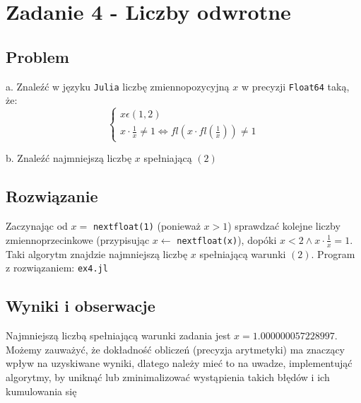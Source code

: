 \documentclass[12pt]{article}
\begin{document}
\newpage

\section*{Zadanie 4 - Liczby odwrotne}
    \subsection*{Problem}
        a. Znaleźć w języku \texttt{Julia} liczbę zmiennopozycyjną $x$ w precyzji \texttt{Float64} taką, że: \newline
        \begin{equation}
            \left
            \lbrace
            \begin{array}{l}
                x \epsilon (1, 2) \\
                x \cdot \frac{1}{x} \ne 1 \iff fl(x \cdot fl(\frac{1}{x})) \ne 1
            \end{array}
            \right.
        \end{equation}

        \noindent b. Znaleźć najmniejszą liczbę $x$ spełniającą $(2)$

    \subsection*{Rozwiązanie}
        Zaczynając od $x =$ \texttt{nextfloat(1)} (ponieważ $x > 1$) sprawdzać kolejne liczby zmiennoprzecinkowe
        (przypisując $x \leftarrow$ \texttt{nextfloat(x)}), dopóki $x < 2 \land x \cdot \frac{1}{x} = 1$.
        \newline\newline
        Taki algorytm znajdzie najmniejszą liczbę $x$ spełniającą warunki $(2)$.
        \newline\newline
        Program z rozwiązaniem: \texttt{ex4.jl}
        \newline

    \subsection*{Wyniki i obserwacje}
        Najmniejszą liczbą spełniającą warunki zadania jest $x = 1.000000057228997$.
        \newline\newline
        Możemy zauważyć, że dokładność obliczeń (precyzja arytmetyki) ma znaczący wpływ na uzyskiwane wyniki,
        dlatego należy mieć to na uwadze, implementująć algorytmy, by uniknąć lub zminimalizować wystąpienia
        takich błędów i ich kumulowania się
\end{document}
